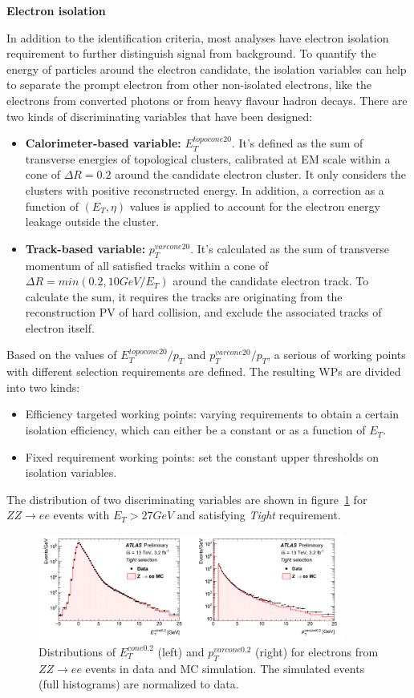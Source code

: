 \textbf{Electron isolation}

In addition to the identification criteria, most analyses have electron isolation requirement to further distinguish signal from background.
To quantify the energy of particles around the electron candidate, the isolation variables can help to separate the prompt electron from other non-isolated electrons, like the electrons from converted photons or from heavy flavour hadron decays.
There are two kinds of discriminating variables that have been designed:
\begin{itemize}
	\item \textbf{Calorimeter-based variable:} $E_{T}^{topocone20}$. It's defined as the sum of transverse energies of topological clusters\cite{Aad:2016upy}, calibrated at EM scale within a cone of $\Delta R = 0.2$ around the  candidate electron cluster. It only considers the clusters with positive reconstructed energy. In addition, a correction as a function of $(E_{T}, \eta)$ values is applied to account for the electron energy leakage outside the cluster.
	\item \textbf{Track-based variable:} $p_{T}^{varcone20}$. It's calculated as the sum of transverse momentum of all satisfied tracks within a cone of $\Delta R = min(0.2, 10 GeV/E_{T})$ around the candidate electron track. To calculate the sum, it requires the tracks are originating from the reconstruction PV of hard collision, and exclude the associated tracks of electron itself.
\end{itemize}
Based on the values of $E_{T}^{topocone20}/p_{T}$ and $p_{T}^{varcone20}/p_{T}$, a serious of working points with different selection requirements are defined.
The resulting WPs are divided into two kinds:
\begin{itemize}
	\item Efficiency targeted working points: varying requirements to obtain a certain isolation efficiency, which can either be a constant or as a function of $E_{T}$.
	\item Fixed requirement working points: set the constant upper thresholds on isolation variables.
\end{itemize}
The distribution of two discriminating variables are shown in figure~\ref{fig:ele_iso} for $ZZ \rightarrow ee$ events with $E_{T} > 27 GeV$ and satisfying \textit{Tight} requirement.
\begin{figure}[!htb]
  \centering
  \includegraphics[width=0.9\textwidth]{figures/Simulation/ele_iso.png}
  \caption{Distributions of $E_{T}^{cone0.2}$ (left) and $p_{T}^{varcone0.2}$ (right) for electrons from $ZZ \rightarrow ee$ events in data and MC simulation. The simulated events (full histograms) are normalized to data.}
  \label{fig:ele_iso}
\end{figure}

